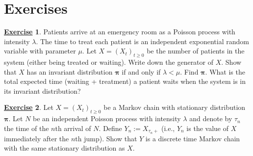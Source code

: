 \documentclass[12pt]{book}
\numberwithin{equation}{chapter}
\theoremstyle{plain}
\numberwithin{theorem}{section}
\theoremstyle{definition}
\newtheorem{exercise}{\underline{Exercise}}
\numberwithin{exercise}{chapter}
\let\oldendproof\endproof
\renewenvironment{proof}[1][\proofname]{%
  \oldproof[\scshape\underline{#1}]%
}{\oldendproof}
\newcommand{\<}{\langle}
\renewcommand{\>}{\rangle}
\renewcommand{\(}{\left(}
\renewcommand{\)}{\right)}
\renewcommand{\[}{\left[}
\renewcommand{\]}{\right]}
\newcommand\lam{\lambda}
\newcommand\Pv{\pmb{P}}
\newcommand\muv{\pmb{\mu}}
\newcommand\piv{\pmb{\pi}}
\begin{document}







\section{Exercises}
\label{sec:exercises-5}

\begin{exercise}
\label{exer:5.1}
Patients arrive at an emergency room as a Poisson process with intensity $\lam$.  The time to treat each patient is an independent exponential random variable with parameter $\mu$.  Let $X = (X_t)_{t \geq 0}$ be the number of patients in the system (either being treated or waiting).  Write down the generator of $X$.  Show that $X$ has an invariant distribution $\piv$ if and only if $\lam < \mu$.   Find $\piv$.  What is the total expected time (waiting + treatment) a patient waits when the system is in its invariant distribution?
\end{exercise}
%

\begin{exercise}
\label{exer:5.2}
Let $X = (X_t)_{t \geq 0}$ be a Markov chain with stationary distribution $\piv$.  Let $N$ be an independent Poisson process with intensity $\lam$ and denote by $\tau_n$ the time of the $n$th arrival of $N$.  Define $Y_n := X_{\tau_n +}$ (i.e., $Y_n$ is the value of $X$ immediately after the $n$th jump).  Show that $Y$ is a discrete time Markov chain with the same stationary distribution as $X$.
\end{exercise}
%
\end{document}
